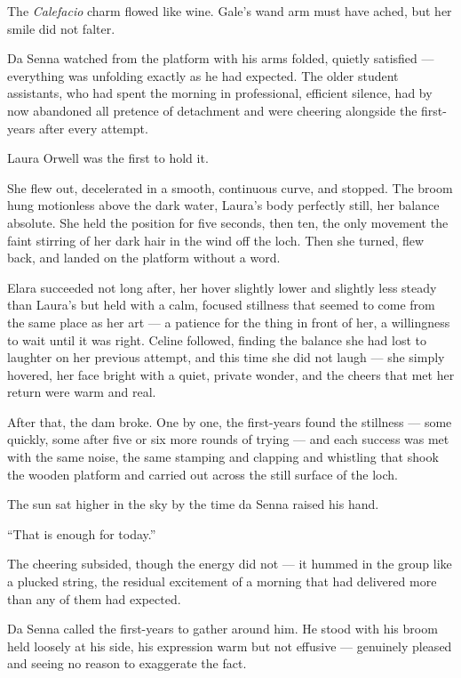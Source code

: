 The \textit{Calefacio} charm flowed like wine. Gale's wand arm must have ached, but her smile did not falter.
 
Da Senna watched from the platform with his arms folded, quietly satisfied --- everything was unfolding exactly as he had expected. The older student assistants, who had spent the morning in professional, efficient silence, had by now abandoned all pretence of detachment and were cheering alongside the first-years after every attempt.
 
Laura Orwell was the first to hold it.
 
She flew out, decelerated in a smooth, continuous curve, and stopped. The broom hung motionless above the dark water, Laura's body perfectly still, her balance absolute. She held the position for five seconds, then ten, the only movement the faint stirring of her dark hair in the wind off the loch. Then she turned, flew back, and landed on the platform without a word.
 
Elara succeeded not long after, her hover slightly lower and slightly less steady than Laura's but held with a calm, focused stillness that seemed to come from the same place as her art --- a patience for the thing in front of her, a willingness to wait until it was right. Celine followed, finding the balance she had lost to laughter on her previous attempt, and this time she did not laugh --- she simply hovered, her face bright with a quiet, private wonder, and the cheers that met her return were warm and real.
 
After that, the dam broke. One by one, the first-years found the stillness --- some quickly, some after five or six more rounds of trying --- and each success was met with the same noise, the same stamping and clapping and whistling that shook the wooden platform and carried out across the still surface of the loch.
 
The sun sat higher in the sky by the time da Senna raised his hand.
 
\enquote{That is enough for today.}
 
The cheering subsided, though the energy did not --- it hummed in the group like a plucked string, the residual excitement of a morning that had delivered more than any of them had expected.
 
Da Senna called the first-years to gather around him. He stood with his broom held loosely at his side, his expression warm but not effusive --- genuinely pleased and seeing no reason to exaggerate the fact.
 
